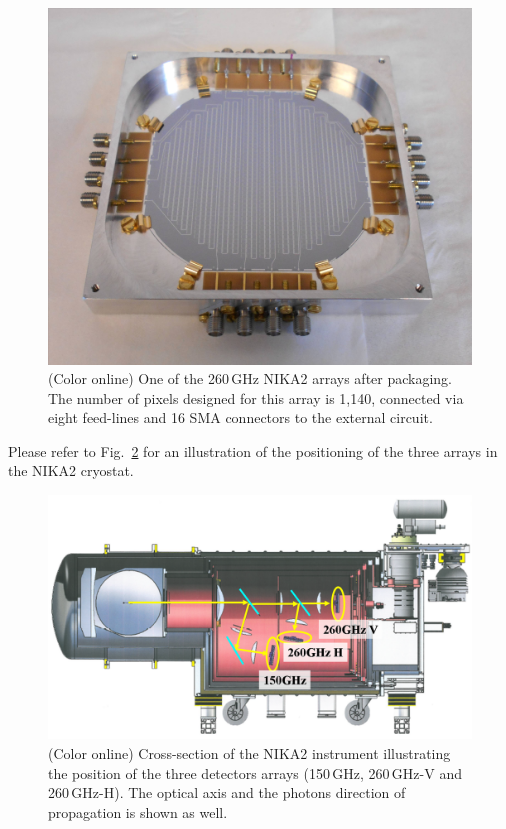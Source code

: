 \documentclass[]{aa} %
\begin{document}
\begin{figure}[h]
   \centering
    \includegraphics[width=.95\linewidth]{1mm_array.jpg}
      \caption{(Color online) One of the 260\,GHz NIKA2 arrays after packaging. The number of pixels designed for this array is 1,140, connected via eight feed-lines and 16 SMA connectors to the external circuit.}
         \label{Array}
\end{figure}

Please refer to Fig.~\ref{Cryostat} for an illustration of the positioning of the three arrays in the NIKA2 cryostat.
 
\begin{figure}[h]
   \centering
   \includegraphics[width=.95\linewidth]{Fig1_cryo.png}
      \caption{(Color online) Cross-section of the NIKA2 instrument illustrating the position of the three detectors arrays (150\,GHz, 260\,GHz-V and 260\,GHz-H). The optical axis and the photons direction of propagation is shown as well.}
         \label{Cryostat}
\end{figure}
\end{document}
